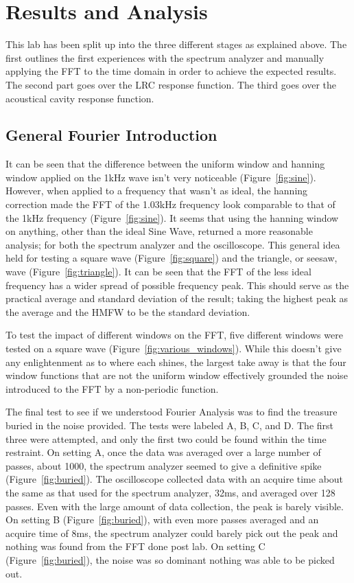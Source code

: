 \documentclass[12pt]{article}
\begin{document}
\section{Results and Analysis}
    
This lab has been split up into the three different stages as explained above. The first outlines the first experiences with the spectrum analyzer and manually applying the FFT to the time domain in order to achieve the expected results. The second part goes over the LRC response function. The third goes over the acoustical cavity response function. 
    

    
\subsection{General Fourier Introduction}
It can be seen that the difference between the uniform window and hanning window applied on the 1kHz wave isn't very noticeable (Figure~\ref{fig:sine}). However, when applied to a frequency that wasn't as ideal, the hanning correction made the FFT of the 1.03kHz frequency look comparable to that of the 1kHz frequency (Figure~\ref{fig:sine}). It seems that using the hanning window on anything, other than the ideal Sine Wave, returned a more reasonable analysis; for both the spectrum analyzer and the oscilloscope. This general idea held for testing a square wave (Figure~\ref{fig:square}) and the triangle, or seesaw, wave (Figure~\ref{fig:triangle}). It can be seen that the FFT of the less ideal frequency has a wider spread of possible frequency peak. This should serve as the practical average and standard deviation of the result; taking the highest peak as the average and the HMFW to be the standard deviation.
    
To test the impact of different windows on the FFT, five different windows were tested on a square wave (Figure~\ref{fig:various_windows}). While this doesn't give any enlightenment as to where each shines, the largest take away is that the four window functions that are not the uniform window effectively grounded the noise introduced to the FFT by a non-periodic function.  
    
The final test to see if we understood Fourier Analysis was to find the treasure buried in the noise provided. The tests were labeled A, B, C, and D. The first three were attempted, and only the first two could be found within the time restraint. On setting A, once the data was averaged over a large number of passes, about 1000, the spectrum analyzer seemed to give a definitive spike (Figure~\ref{fig:buried}). The oscilloscope collected data with an acquire time about the same as that used for the spectrum analyzer, 32ms, and averaged over 128 passes. Even with the large amount of data collection, the peak is barely visible. On setting B (Figure~\ref{fig:buried}), with even more passes averaged and an acquire time of 8ms, the spectrum analyzer could barely pick out the peak and nothing was found from the FFT done post lab. On setting C (Figure~\ref{fig:buried}), the noise was so dominant nothing was able to be picked out. 
\end{document}
